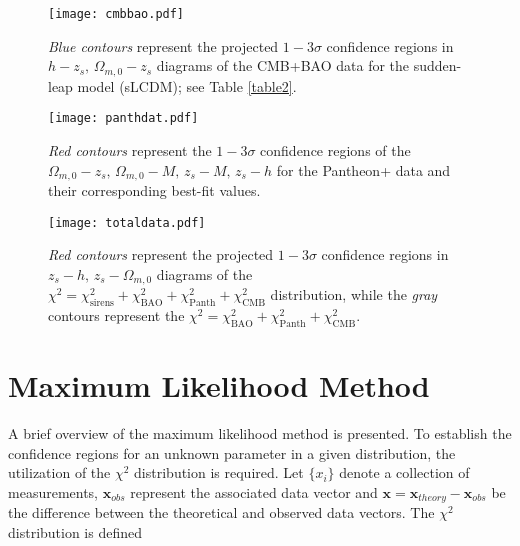 \documentclass[universe,article,accept,moreauthors,pdftex]{Definitions/mdpi}
\begin{document}
\vspace{-9pt}

\begin{figure}[H] 
    \texttt{[image: cmbbao.pdf]}
    \caption{\textit{Blue contours} represent the projected  $1-3\sigma$ confidence regions in $h-z_{s},\,\Omega_{m,0}-z_s$ diagrams of the CMB+BAO data for the sudden-leap model (sLCDM); see Table \ref{table2}.}
    \label{DataA2}
\end{figure}


\vspace{-6pt}


 \begin{figure}[H] 
    \texttt{[image: panthdat.pdf]}
    \caption{\textit{Red contours} represent the $1-3\sigma$ confidence regions of the $\Omega_{m,0}-z_{s},\,\Omega_{m,0}-M,\,z_{s}-M,\,z_{s}-h$ for the Pantheon+ data and their corresponding best-fit values.}
    \label{DataA3}
\end{figure}
\vspace{-9pt}
\begin{figure}[H] 
    \texttt{[image: totaldata.pdf]}
    \caption{\textit{Red contours} represent the projected $1-3\sigma$ confidence regions in $z_{s}-h,\, z_{s}-\Omega_{m,0}$ diagrams of the $\chi^{2}=\chi^{2}_{\text{sirens}}+\chi^{2}_{\text{BAO}}+\chi^{2}_{\text{Panth}}+\chi^{2}_{\text{CMB}}$ distribution, while the \textit{gray} contours represent the  $\chi^{2}=\chi^{2}_{\text{BAO}}+\chi^{2}_{\text{Panth}}+\chi^{2}_{\text{CMB}}$. }
    \label{DataA4}
\end{figure}








\section[\appendixname~\thesection]{Maximum Likelihood Method}
\label{AppendixB}



A brief overview of the maximum likelihood method is presented. To establish the confidence regions for an unknown parameter in a given distribution, the utilization of the $\chi^{2}$ distribution is required. Let $\{x_{i}\}$ denote a collection of measurements, $\textbf{x}_{obs}$ represent the associated data vector and $\textbf{x}=\textbf{x}_{theory}-\textbf{x}_{obs}$ be the difference between the theoretical and observed data vectors. The $\chi^{2}$ distribution is defined \cite{dodelson2020modern,article411,Theodoropoulos:2021hkk,Verde_2010}
\end{document}

